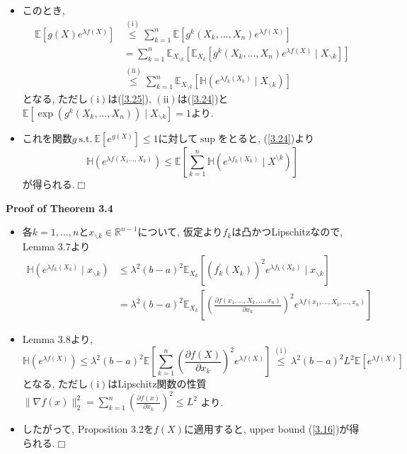 \documentclass[aspectratio=169, dvipdfmx]{beamer}
\def\qed{\hfill $\Box$}
\newcommand{\ex}{\mathbb{E}}
\begin{document}
\begin{frame}
\begin{itemize}
    \item このとき,
    \begin{align*}
        \mathbb{E}\left[g(X) e^{\lambda f(X)}\right] 
        & \stackrel{(\mathrm{i})}{\le} \sum_{k=1}^{n} \mathbb{E}\left[g^{k}\left(X_{k}, \ldots, X_{n}\right) e^{\lambda f(X)}\right] \\
        &=\sum_{k=1}^{n} \mathbb{E}_{X_{\setminus k}}\left[\mathbb{E}_{X_{k}}\left[g^{k}\left(X_{k}, \ldots, X_{n}\right) e^{\lambda f(X)} \mid X_{\backslash k}\right]\right] \\
        & \stackrel{(\mathrm{ii})}{\leq} \sum_{k=1}^{n} \mathbb{E}_{X_{\setminus k}}\left[\mathbb{H}\left(e^{\lambda f_{k}\left(X_{k}\right)} \mid X_{\backslash k}\right)\right]
    \end{align*}
    となる, ただし$(\mathrm{i})$は(\ref{3.25}), $(\mathrm{ii})$は(\ref{3.24})と$\ex[\exp(g^k(X_k,\dots,X_n))\mid X_{\backslash k}] = 1$より.
    \item これを関数$g \mathrm{\ s.t.\ } \ex[e^{g(X)}]\le 1$に対して$\sup$をとると, (\ref{3.24})より
    \[ \mathbb{H}(e^{\lambda f(X_1\dots,X_k)})
    \le \ex\left[ \sum_{k=1}^n \mathbb{H}(e^{\lambda f_k(X_k)} \mid X^{\setminus k}) \right] \]
    が得られる.\qed
\end{itemize}
\end{frame}

\begin{frame}{}{}
{\bf Proof of Theorem 3.4}
\begin{itemize}
    \item 各$k=1,\dots,n$と$x_{\backslash k}\in\mathbb{R}^{n-1}$について, 仮定より$f_k$は凸かつLipschitzなので,
    Lemma 3.7より 
    \begin{align*}
        \mathbb{H}\left(e^{\lambda f_{k}\left(X_{k}\right)} \mid x_{\backslash k}\right)
        &\leq \lambda^{2}(b-a)^{2} \mathbb{E}_{X_{k}}\left[\left(f_{k}^{\prime}\left(X_{k}\right)\right)^{2} e^{\lambda f_{k}\left(X_{k}\right)} \mid x_{\backslash k}\right] \\
        &=\lambda^{2}(b-a)^{2} \mathbb{E}_{X_{k}}\left[\left(\frac{\partial f\left(x_{1}, \ldots, X_{k}, \ldots, x_{n}\right)}{\partial x_{k}}\right)^{2} e^{\lambda f\left(x_{1}, \ldots, X_{k}, \ldots, x_{n}\right)}\right]
    \end{align*}
    \item Lemma 3.8より,
    \[
        \mathbb{H}\left(e^{\lambda f(X)}\right)
        \leq \lambda^{2}(b-a)^{2} \mathbb{E}\left[\sum_{k=1}^{n}\left(\frac{\partial f(X)}{\partial x_{k}}\right)^{2} e^{\lambda f(X)}\right]
        \stackrel{(\mathrm{i})}{\leq}  \lambda^{2}(b-a)^{2} L^{2} \mathbb{E}\left[e^{\lambda f(X)}\right]
    \]
    となる, ただし$\mathrm{(i)}$はLipschitz関数の性質
    $\|\nabla f(x)\|_{2}^{2}=\sum_{k=1}^{n}\left(\frac{\partial f(x)}{\partial x_{k}}\right)^{2} \leq L^{2}$
    より.
    \item したがって, Proposition 3.2を$f(X)$に適用すると, upper bound (\ref{3.16})が得られる.\qed
\end{itemize}
\end{frame}
\end{document}
